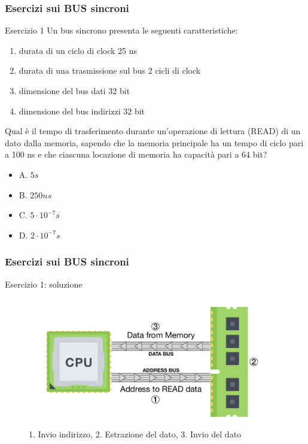 \begin{frame}
	\frametitle{Esercizi sui BUS sincroni}
	
	\begin{block}{Esercizio 1}
		Un bus sincrono presenta le seguenti caratteristiche:
		\begin{scriptsize}
		\begin{enumerate}
			\item durata di un ciclo di clock 25 ns
			\item durata di una trasmissione sul bus 2 cicli di clock
			\item dimensione del bus dati 32 bit
			\item dimensione del bus indirizzi 32 bit
		\end{enumerate}
		\end{scriptsize}
		Qual è il tempo di trasferimento durante un’operazione di lettura (READ) di un dato dalla memoria, sapendo che la memoria principale ha un tempo di ciclo pari a 100 ns e che ciascuna locazione di memoria ha capacità pari a 64 bit?
		
		\begin{scriptsize}
		\begin{itemize}
			\item A. $5 s$
			\item B. $250 ns$
			\item C. $5 \cdot 10^{-7} s$
			\item D. $2 \cdot 10^{-7} s$
		\end{itemize}
		\end{scriptsize}
	
	\end{block}
\end{frame}


\begin{frame}
	\frametitle{Esercizi sui BUS sincroni}
	
	\begin{block}{Esercizio 1: soluzione}
		\begin{figure}[!htbp]
			\centering
			\includegraphics[width=0.86\linewidth]{images/6_bus/bus_synch.pdf}
			\caption{{\color{CpuGreen}1. Invio indirizzo}, {\color{CpuBlue}2. Estrazione del dato}, {\color{CpuRed}3. Invio del dato}}
		\end{figure}
	\end{block}
\end{frame}


